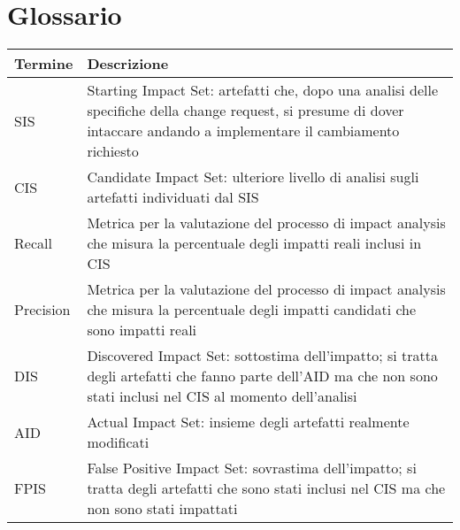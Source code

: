 \chapter{Glossario}
\begin{center}
\begin{longtable}{lp{}}
\hline 
\rowcolor[gray]{.80}
\textbf{Termine} & \textbf{Descrizione} \tabularnewline
\hline 
SIS & 
Starting Impact Set: artefatti che, dopo una analisi delle specifiche della change request, si presume di dover intaccare andando a implementare il cambiamento richiesto
\tabularnewline
\hline
CIS & 
Candidate Impact Set: ulteriore livello di analisi sugli artefatti individuati dal SIS
\tabularnewline
\hline
Recall & 
Metrica per la valutazione del processo di impact analysis che misura la percentuale degli impatti reali inclusi in CIS
\tabularnewline
\hline
Precision & 
Metrica per la valutazione del processo di impact analysis che misura la percentuale degli impatti candidati che sono impatti reali
\tabularnewline
\hline
DIS & 
Discovered Impact Set: sottostima dell'impatto; si tratta degli artefatti che fanno parte dell'AID ma che non sono stati inclusi nel CIS al momento dell'analisi
\tabularnewline
\hline
AID & 
Actual Impact Set: insieme degli artefatti realmente modificati
\tabularnewline
\hline
FPIS & 
False Positive Impact Set: sovrastima dell'impatto; si tratta degli artefatti che sono stati inclusi nel CIS ma che non sono stati impattati
\tabularnewline
\hline
\end{longtable}
\end{center}




